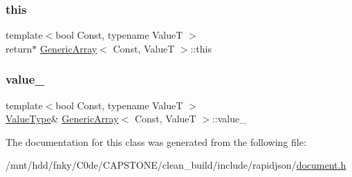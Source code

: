 \mbox{\label{classGenericArray_aef8b7baa9ec5cd68d8951fa8bad85217}} 
\subsubsection{\texorpdfstring{this}{this}}
{\footnotesize\ttfamily template$<$bool Const, typename ValueT $>$ \\
return$\ast$ \hyperlink{classGenericArray}{Generic\+Array}$<$ Const, ValueT $>$\+::this}

\mbox{\label{classGenericArray_afac7de0d842f341d32a36919fd17cad5}} 
\subsubsection{\texorpdfstring{value\+\_\+}{value\_}}
{\footnotesize\ttfamily template$<$bool Const, typename ValueT $>$ \\
\hyperlink{classGenericArray_a93e53f38a99fc5167eb2a28653de64ed}{Value\+Type}\& \hyperlink{classGenericArray}{Generic\+Array}$<$ Const, ValueT $>$\+::value\+\_\+\hspace{0.3cm}{\ttfamily [private]}}



The documentation for this class was generated from the following file\+:\begin{DoxyCompactItemize}
\item 
/mnt/hdd/fnky/\+C0de/\+C\+A\+P\+S\+T\+O\+N\+E/clean\+\_\+build/include/rapidjson/\hyperlink{document_8h}{document.\+h}\end{DoxyCompactItemize}
